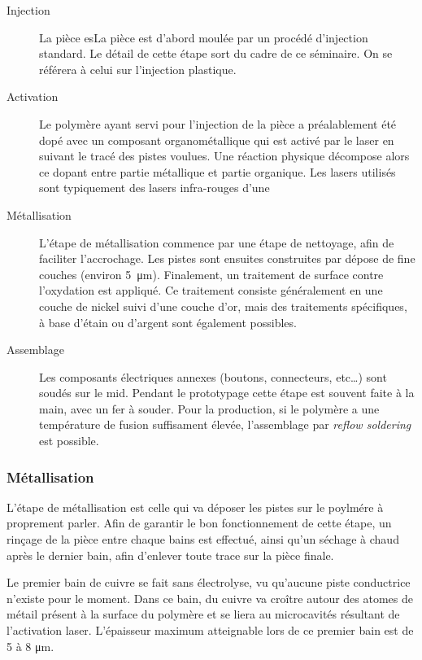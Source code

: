 \begin{description}
    \item[Injection] La pièce esLa pièce est d'abord moulée par un procédé d'injection standard.
        Le détail de cette étape sort du cadre de ce séminaire.
        On se référera à celui sur l'injection plastique.

    \item[Activation] Le polymère ayant servi pour l'injection de la pièce a préalablement été dopé avec un composant organométallique qui est activé par le laser en suivant le tracé des pistes voulues.
        Une réaction physique décompose alors ce dopant entre partie métallique et partie organique.
    Les lasers utilisés sont typiquement des lasers infra-rouges d'une \item[Métallisation] L'étape de métallisation commence par une étape de nettoyage, afin de faciliter l'accrochage.
        Les pistes sont ensuites construites par dépose de fine couches (environ \SI{5}{\micro\meter}).
        Finalement, un traitement de surface contre l'oxydation est appliqué.
        Ce traitement consiste généralement en une couche de nickel suivi d'une couche d'or, mais des traitements spécifiques, à base d'étain ou d'argent sont également possibles.
    \item[Assemblage] Les composants électriques annexes (boutons, connecteurs, etc\ldots) sont soudés sur le \gls{mid}.
        Pendant le prototypage cette étape est souvent faite à la main, avec un fer à souder.
        Pour la production, si le polymère a une température de fusion suffisament élevée, l'assemblage par \emph{reflow soldering} est possible.

\end{description}

\subsubsection{Métallisation}
L'étape de métallisation est celle qui va déposer les pistes sur le poylmére à proprement parler.
Afin de garantir le bon fonctionnement de cette étape, un rinçage de la pièce entre chaque bains est effectué, ainsi qu'un séchage à chaud après le dernier bain, afin d'enlever toute trace sur la pièce finale.

Le premier bain de cuivre se fait sans électrolyse, vu qu'aucune piste conductrice n'existe pour le moment.
Dans ce bain, du cuivre va croître autour des atomes de métail présent à la surface du polymère et se liera au microcavités résultant de l'activation laser.
L'épaisseur maximum atteignable lors de ce premier bain est de 5 à 8 \si{\micro\meter}.

